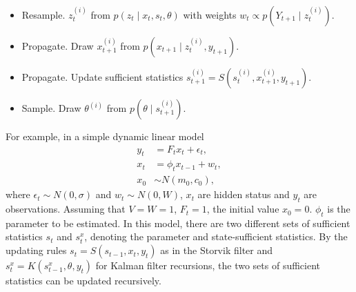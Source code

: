 \begin{itemize}
\item Resample. $z_t^{(i)}$ from $p(z_t\mid x_t,s_t,\theta)$ with weights $w_t\propto p(Y_{t+1}\mid z_t^{(i)})$. 
\item Propagate. Draw $x_{t+1}^{(i)}$ from $p(x_{t+1}\mid z_t^{(i)},y_{t+1})$.
\item Propagate. Update sufficient statistics $s_{t+1}^{(i)}=S(s_{t}^{(i)},x_{t+1}^{(i)},y_{t+1})$.
\item Sample. Draw $\theta^{(i)}$ from $p(\theta\mid s_{t+1}^{(i)})$.
\end{itemize}

For example, in a simple dynamic linear model 
\begin{align*}
y_t&=F_tx_t+\epsilon_t,\\
x_t&=\phi_tx_{t-1}+w_t,\\
x_0&\sim N(m_0,c_0),
\end{align*}
where $\epsilon_t\sim N(0,\sigma)$ and $w_t\sim N(0,W)$, $x_t$ are hidden status and $y_t$ are observations. Assuming that $V=W=1$, $F_t=1$, the initial value $x_0=0$. $\phi_t$ is the  parameter to be estimated. In this model, there are two different sets of sufficient statistics $s_t$ and $s_t^x$, denoting the parameter and state-sufficient statistics. By the updating rules $s_t=S(s_{t-1},x_t,y_t)$ as in the Storvik filter and $s_t^x=K(s_{t-1}^x,\theta,y_t)$ for Kalman filter recursions, the two sets of sufficient statistics can be updated recursively. 

